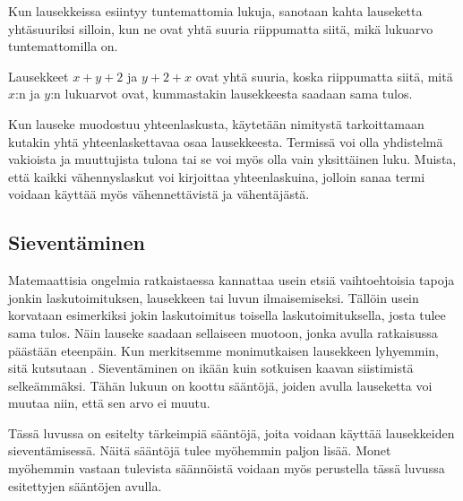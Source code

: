 Kun lausekkeissa esiintyy tuntemattomia lukuja, sanotaan kahta lauseketta yhtäsuuriksi silloin, kun ne ovat yhtä suuria riippumatta siitä, mikä lukuarvo tuntemattomilla on.

\begin{esimerkki}
Lausekkeet $x+y+2$ ja $y+2+x$ ovat yhtä suuria, koska riippumatta siitä, mitä $x$:n ja $y$:n lukuarvot ovat, kummastakin lausekkeesta saadaan sama tulos.
\end{esimerkki}

Kun lauseke muodostuu yhteenlaskusta, käytetään nimitystä  tarkoittamaan kutakin yhtä yhteenlaskettavaa osaa lausekkeesta. Termissä voi olla yhdistelmä vakioista ja muuttujista tulona tai se voi myös olla vain yksittäinen luku. Muista, että kaikki vähennyslaskut voi kirjoittaa yhteenlaskuina, jolloin sanaa termi voidaan käyttää myös vähennettävistä ja vähentäjästä.

\begin{esimerkki}
\end{esimerkki}


\subsection{Sieventäminen}

Matemaattisia ongelmia ratkaistaessa kannattaa usein etsiä vaihtoehtoisia tapoja jonkin laskutoimituksen, lausekkeen tai luvun ilmaisemiseksi. Tällöin usein korvataan esimerkiksi jokin laskutoimitus toisella laskutoimituksella, josta tulee sama tulos. Näin lauseke saadaan sellaiseen muotoon, jonka avulla ratkaisussa päästään eteenpäin. Kun merkitsemme monimutkaisen lausekkeen lyhyemmin, sitä kutsutaan . Sieventäminen on ikään kuin sotkuisen kaavan siistimistä selkeämmäksi. Tähän lukuun on koottu sääntöjä, joiden avulla lauseketta voi muutaa niin, että sen arvo ei muutu. %

Tässä luvussa on esitelty tärkeimpiä sääntöjä, joita voidaan käyttää lausekkeiden sieventämisessä. Näitä sääntöjä tulee myöhemmin paljon lisää. Monet myöhemmin vastaan tulevista säännöistä voidaan myös perustella tässä luvussa esitettyjen sääntöjen avulla.

